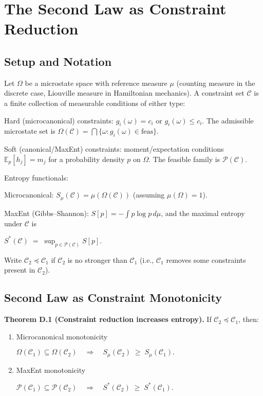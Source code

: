 \documentclass[12pt,a4paper]{article}
\begin{document}
\section{The Second Law as Constraint Reduction}

\subsection{Setup and Notation}

Let $\Omega$ be a microstate space with reference measure $\mu$ (counting measure in the discrete case, Liouville measure in Hamiltonian mechanics).
A constraint set $\mathcal{C}$ is a finite collection of measurable conditions of either type:

Hard (microcanonical) constraints: $g_i(\omega) = c_i$ or $g_i(\omega) \leq c_i$.
The admissible microstate set is $\Omega(\mathcal{C}) = \bigcap \{ \omega : g_i(\omega) \in \text{feas} \}$.

Soft (canonical/MaxEnt) constraints: moment/expectation conditions $\mathbb{E}_p [h_j] = m_j$ for a probability density $p$ on $\Omega$.
The feasible family is $\mathcal{P}(\mathcal{C})$.

Entropy functionals:

Microcanonical: $S_\mu(\mathcal{C}) = \mu(\Omega(\mathcal{C}))$ (assuming $\mu(\Omega)=1$).

MaxEnt (Gibbs–Shannon): $S[p] = -\int p \log p \, d\mu$, and the maximal entropy under $\mathcal{C}$ is

$S^*(\mathcal{C}) \;=\; \sup_{p\in \mathcal{P}(\mathcal{C})} S[p].$

Write $\mathcal{C}_2 \preceq \mathcal{C}_1$ if $\mathcal{C}_2$ is no stronger than $\mathcal{C}_1$ (i.e., $\mathcal{C}_1$ removes some constraints present in $\mathcal{C}_2$).

\subsection{Second Law as Constraint Monotonicity}

\textbf{Theorem D.1 (Constraint reduction increases entropy).} If $\mathcal{C}_2 \preceq \mathcal{C}_1$, then:

\begin{enumerate}
\item Microcanonical monotonicity

$\Omega(\mathcal{C}_1)\subseteq \Omega(\mathcal{C}_2) \quad\Rightarrow\quad
   S_\mu(\mathcal{C}_2)\; \ge\; S_\mu(\mathcal{C}_1).$

\item MaxEnt monotonicity

$\mathcal{P}(\mathcal{C}_1)\subseteq \mathcal{P}(\mathcal{C}_2) \quad\Rightarrow\quad
   S^*(\mathcal{C}_2)\; \ge\; S^*(\mathcal{C}_1).$
\end{enumerate}
\end{document}
